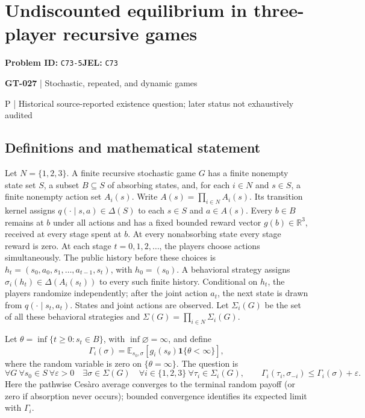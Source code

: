 \documentclass[11pt,a4paper]{article}
\begin{document}
\section*{Undiscounted equilibrium in three-player recursive games}
\textbf{Problem ID:} \texttt{C73-5}\quad \textbf{JEL:} \texttt{C73}\par
\label{problem:OP-0157}
\label{game:GT-027}
{\sffamily\small\color{muted}
{\sffamily\small\color{muted}\textbf{GT-027} | Stochastic, repeated, and dynamic games\par P | Historical source-reported existence question; later status not exhaustively audited\par}
\par}
\subsection*{Definitions and mathematical statement}
Let $N=\{1,2,3\}$. A finite recursive stochastic game $G$ has a finite nonempty state set $S$, a subset $B\subseteq S$ of absorbing states, and, for each $i\in N$ and $s\in S$, a finite nonempty action set $A_i(s)$. Write $A(s)=\prod_{i\in N}A_i(s)$. Its transition kernel assigns $q(\cdot\mid s,a)\in\Delta(S)$ to each $s\in S$ and $a\in A(s)$. Every $b\in B$ remains at $b$ under all actions and has a fixed bounded reward vector $g(b)\in\mathbb R^3$, received at every stage spent at $b$. At every nonabsorbing state every stage reward is zero. At each stage $t=0,1,2,\ldots$, the players choose actions simultaneously. The public history before these choices is $h_t=(s_0,a_0,s_1,\ldots,a_{t-1},s_t)$, with $h_0=(s_0)$. A behavioral strategy assigns $\sigma_i(h_t)\in\Delta(A_i(s_t))$ to every such finite history. Conditional on $h_t$, the players randomize independently; after the joint action $a_t$, the next state is drawn from $q(\cdot\mid s_t,a_t)$. States and joint actions are observed. Let $\Sigma_i(G)$ be the set of all these behavioral strategies and $\Sigma(G)=\prod_{i\in N}\Sigma_i(G)$.

Let $\theta=\inf\{t\geq0:s_t\in B\}$, with $\inf\varnothing=\infty$, and define
\[
 \Gamma_i(\sigma)=\mathbb E_{s_0,\sigma}
 \left[g_i(s_\theta)\mathbf1\{\theta<\infty\}\right],
\]
where the random variable is zero on $\{\theta=\infty\}$. The question is
\[
 \forall G\ \forall s_0\in S\ \forall\varepsilon>0\quad
 \exists\sigma\in\Sigma(G)\quad\forall i\in\{1,2,3\}\ \forall\tau_i\in\Sigma_i(G),\qquad
 \Gamma_i(\tau_i,\sigma_{-i})\leq\Gamma_i(\sigma)+\varepsilon.
\]
Here the pathwise Ces\`aro average converges to the terminal random payoff (or zero if absorption never occurs); bounded convergence identifies its expected limit with $\Gamma_i$.
\end{document}
